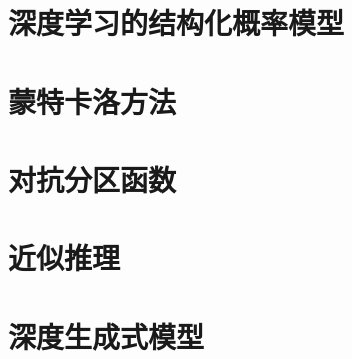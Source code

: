 \documentclass[a4paper,11pt]{book}
\begin{document}
\chapter{深度学习的结构化概率模型}
\label{chap:16}

\chapter{蒙特卡洛方法}
\label{chap:17}


\chapter{对抗分区函数}
\label{chap:18}

\chapter{近似推理}
\label{chap:19}

\chapter{深度生成式模型}
\label{chap:20}
\end{document}
